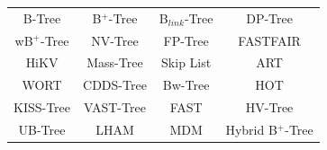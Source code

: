 \documentclass[usenames,dvipsnames, 18pt, compress, aspectratio=169]{beamer}
\begin{document}
\begin{frame}[fragile]{}
    \frametitle{}

    \def\arraystretch{1.5}
    \begin{tabular}{cccc}
        B-Tree & B$^{+}$-Tree & B$_{link}$-Tree & DP-Tree \\
        wB$^{+}$-Tree & NV-Tree & FP-Tree & FASTFAIR \\
        HiKV & Mass-Tree & Skip List & ART \\
        WORT & CDDS-Tree & Bw-Tree & HOT \\
        KISS-Tree & VAST-Tree & FAST & HV-Tree \\
        UB-Tree & LHAM & MDM & Hybrid B$^{+}$-Tree
    \end{tabular}
\end{frame}
\end{document}
